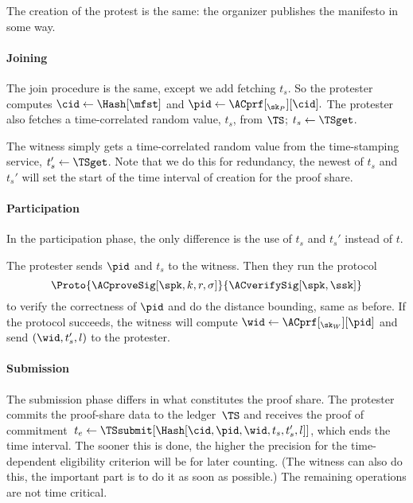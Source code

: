 The creation of the protest is the same: the organizer publishes the manifesto 
in some way.

\paragraph*{Joining}

The join procedure is the same, except we add fetching \(t_s\).
So the protester computes \(
  \cid\gets \Hash[\mfst]
\) and \(
  \pid\gets \ACprf[_{\sk_P}][\cid].
\) The protester also fetches a time-correlated random value, \(t_s\), from 
\(\TS\); \(t_s\gets \TSget\).

The witness simply gets a time-correlated random value from the time-stamping 
service, \(t_s'\gets \TSget\).
Note that we do this for redundancy, the newest of \(t_s\) and \(t_s'\) will 
set the start of the time interval of creation for the proof share.


\paragraph*{Participation}

In the participation phase, the only difference is the use of \(t_s\) and 
\(t_s'\) instead of \(t\).

The protester sends \(\pid\) and \(t_s\) to the witness.
Then they run the protocol \[
  \Proto{\ACproveSig[\spk, k, r, \sigma]}{\ACverifySig[\spk, \ssk]}
\] to verify the correctness of \(\pid\) and do the distance bounding, same as 
before.
If the protocol succeeds, the witness will compute \(\wid \gets 
\ACprf[_{\sk_W}][\pid]\) and send \((\wid, t_s', l)\) to the protester.


\paragraph*{Submission}

The submission phase differs in what constitutes the proof share.
The protester commits the proof-share data to the ledger~\(\TS\) and receives 
the proof of commitment~\(t_e\gets \TSsubmit[\Hash[\cid, \pid, \wid, t_s, t_s', 
l]]\), which ends the time interval.
The sooner this is done, the higher the precision for the time-dependent 
eligibility criterion will be for later counting.
(The witness can also do this, the important part is to do it as soon as 
possible.)
The remaining operations are not time critical.


